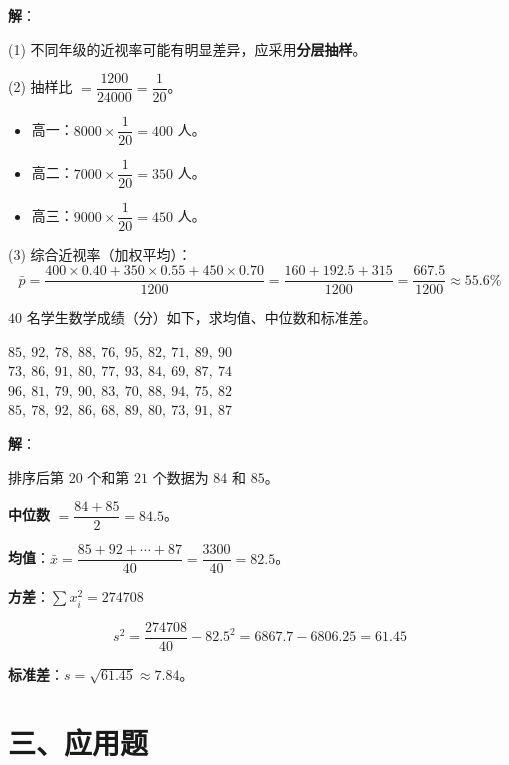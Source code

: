 \documentclass[12pt, a4paper]{ctexart}
\begin{document}
\textbf{解}：

(1) 不同年级的近视率可能有明显差异，应采用\textbf{分层抽样}。

(2) 抽样比 $= \dfrac{1200}{24000} = \dfrac{1}{20}$。
\begin{itemize}
  \item 高一：$8000 \times \dfrac{1}{20} = 400$ 人。
  \item 高二：$7000 \times \dfrac{1}{20} = 350$ 人。
  \item 高三：$9000 \times \dfrac{1}{20} = 450$ 人。
\end{itemize}

(3) 综合近视率（加权平均）：
\[
\bar{p} = \frac{400 \times 0.40 + 350 \times 0.55 + 450 \times 0.70}{1200} = \frac{160 + 192.5 + 315}{1200} = \frac{667.5}{1200} \approx 55.6\%
\]

\begin{examplebox}[【例10】综合统计计算]
$40$ 名学生数学成绩（分）如下，求均值、中位数和标准差。

\begin{center}
\small
$85,\ 92,\ 78,\ 88,\ 76,\ 95,\ 82,\ 71,\ 89,\ 90$\\
$73,\ 86,\ 91,\ 80,\ 77,\ 93,\ 84,\ 69,\ 87,\ 74$\\
$96,\ 81,\ 79,\ 90,\ 83,\ 70,\ 88,\ 94,\ 75,\ 82$\\
$85,\ 78,\ 92,\ 86,\ 68,\ 89,\ 80,\ 73,\ 91,\ 87$
\end{center}
\end{examplebox}

\textbf{解}：

排序后第 $20$ 个和第 $21$ 个数据为 $84$ 和 $85$。

\textbf{中位数} $= \dfrac{84 + 85}{2} = 84.5$。

\textbf{均值}：$\bar{x} = \dfrac{85+92+\cdots+87}{40} = \dfrac{3300}{40} = 82.5$。

\textbf{方差}：$\sum x_i^2 = 274708$

\[
s^2 = \frac{274708}{40} - 82.5^2 = 6867.7 - 6806.25 = 61.45
\]

\textbf{标准差}：$s = \sqrt{61.45} \approx 7.84$。

\section*{\textcolor{apppurple}{三、应用题}}
\end{document}
